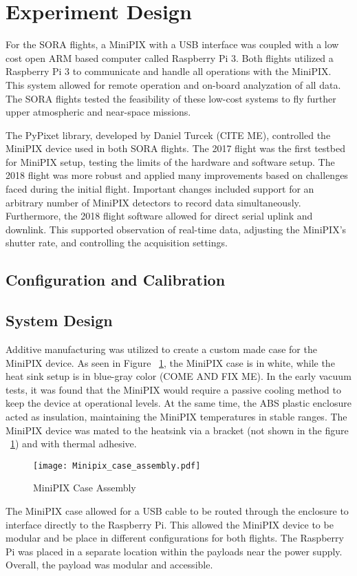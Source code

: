 \section{Experiment Design}
\label{Experiment Design}
For the SORA flights, a MiniPIX with a USB interface was coupled with a low cost open ARM based computer called Raspberry Pi 3.  Both flights utilized a Raspberry Pi 3 to communicate and handle all operations with the MiniPIX.  This system allowed for remote operation and on-board analyzation of all data.  The SORA flights tested the feasibility of these low-cost systems to fly further upper atmospheric and near-space missions.  

The PyPixet library, developed by Daniel Turcek (CITE ME), controlled the MiniPIX device used in both SORA flights.  The 2017 flight was the first testbed for MiniPIX setup, testing the limits of the hardware and software setup.  The 2018 flight was more robust and applied many improvements based on challenges faced during the initial flight.  Important changes included support for an arbitrary number of MiniPIX detectors to record data simultaneously.  Furthermore, the 2018 flight software allowed for direct serial uplink and downlink. This supported observation of real-time data, adjusting the MiniPIX's shutter rate, and controlling the acquisition settings.

\subsection{Configuration and Calibration}
\subsection{System Design}
Additive manufacturing was utilized to create a custom made case for the MiniPIX device.  As seen in Figure ~\ref{fig:minipix_case}, the MiniPIX case is in white, while the heat sink setup is in blue-gray color (COME AND FIX ME).  In the early vacuum tests, it was found that the MiniPIX would require a passive cooling method to keep the device at operational levels.  At the same time, the ABS plastic enclosure acted as insulation, maintaining the MiniPIX temperatures in stable ranges.  The MiniPIX device was mated to the heatsink via a bracket (not shown in the figure ~\ref{fig:minipix_case}) and with thermal adhesive.
\begin{figure}[h]
    \centering
    \texttt{[image: Minipix\_case\_assembly.pdf]}
    \caption{MiniPIX Case Assembly}
    \label{fig:minipix_case}
\end{figure}
The MiniPIX case allowed for a USB cable to be routed through the enclosure to interface directly to the Raspberry Pi.  This allowed the MiniPIX device to be modular and be place in different configurations for both flights.  The Raspberry Pi was placed in a separate location within the payloads near the power supply.  Overall, the payload was modular and accessible.



